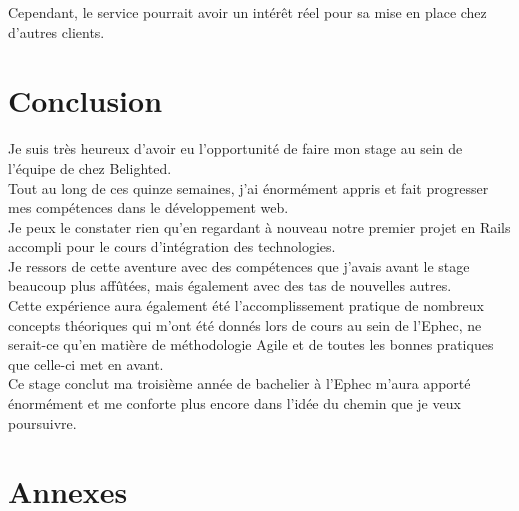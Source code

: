 \documentclass{report}
\begin{document}
        Cependant, le service pourrait avoir un intérêt réel pour sa mise en place chez d'autres clients.\\


\chapter{Conclusion}

  Je suis très heureux d'avoir eu l'opportunité de faire mon stage au sein de l'équipe de chez Belighted.\\

  Tout au long de ces quinze semaines, j'ai énormément appris et fait progresser mes compétences dans le développement web.\\
  Je peux le constater rien qu'en regardant à nouveau notre premier projet en Rails accompli pour le cours d'intégration des technologies.\\

  Je ressors de cette aventure avec des compétences que j'avais avant le stage beaucoup plus affûtées, mais également avec des tas de nouvelles autres.\\
  Cette expérience aura également été l'accomplissement pratique de nombreux concepts théoriques qui m'ont été donnés lors de cours au sein de l'Ephec, ne serait-ce qu'en
  matière de méthodologie Agile et de toutes les bonnes pratiques que celle-ci met en avant.\\

  Ce stage conclut ma troisième année de bachelier à l'Ephec m'aura apporté énormément et me conforte plus encore dans l'idée du chemin que je veux poursuivre.\\

\chapter*{Annexes}

    

    

    

    

    
\end{document}
